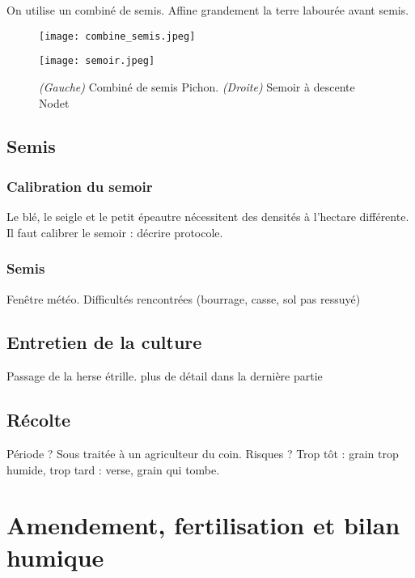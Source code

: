\documentclass{article}
\begin{document}
On utilise un combiné de semis. Affine grandement la terre labourée avant semis.

\begin{figure}[h!]
\centering
\begin{minipage}{.5\textwidth}
  \centering
  \texttt{[image: combine\_semis.jpeg]}
  \label{fig:test1}
\end{minipage}%
\begin{minipage}{.5\textwidth}
  \centering
  \texttt{[image: semoir.jpeg]}
  \label{fig:test2}
\end{minipage}
\caption{\textit{(Gauche)} Combiné de semis Pichon. \textit{(Droite)} Semoir à descente Nodet}
\label{fig:test}
\end{figure}

\subsection{Semis}

\subsubsection{Calibration du semoir}

Le blé, le seigle et le petit épeautre nécessitent des densités à l'hectare différente. Il faut calibrer le semoir : décrire protocole.

\subsubsection{Semis}

Fenêtre météo. Difficultés rencontrées (bourrage, casse, sol pas ressuyé)

\subsection*{Entretien de la culture}

Passage de la herse étrille. plus de détail dans la dernière partie

\subsection{Récolte}

Période ? Sous traitée à un agriculteur du coin. 
Risques ? Trop tôt : grain trop humide, trop tard : verse, grain qui tombe. 

\section{Amendement, fertilisation et bilan humique}
\end{document}
